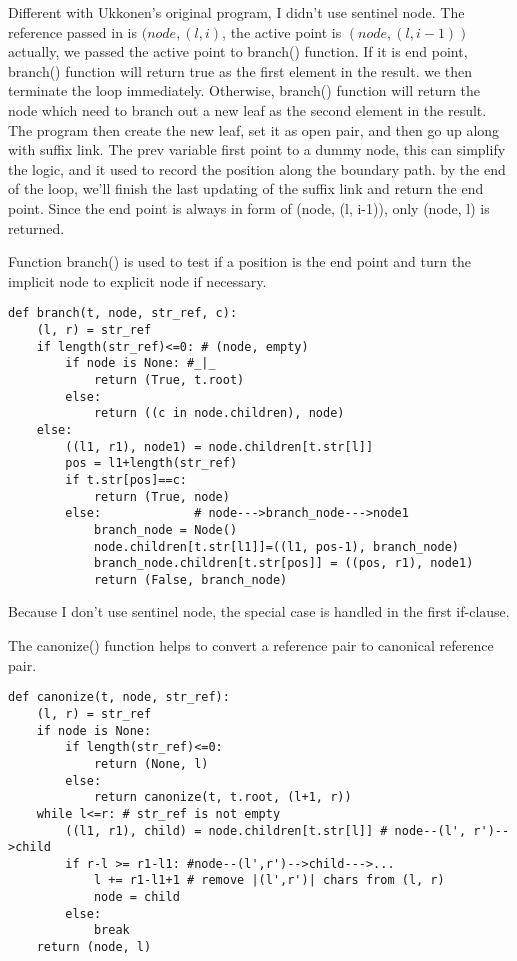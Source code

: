 \documentclass{article}
\begin{document}
Different with Ukkonen's original program, I didn't use sentinel node.
The reference passed in is $(node, (l, i)$, the active point is
$(node, (l, i-1))$ actually, we passed the active point to branch() 
function. If it is end point, branch() function will return true
as the first element in the result. we then terminate the loop immediately.
Otherwise, branch() function will return the node which need to branch
out a new leaf as the second element in the result. The program
then create the new leaf, set it as open pair, and then go up along
with suffix link. The prev variable first point to a dummy node,
this can simplify the logic, and it used to record the position along
the boundary path. by the end of the loop, we'll finish the last
updating of the suffix link and return the end point. Since the end
point is always in form of (node, (l, i-1)), only (node, l) is returned.

Function branch() is used to test if a position is the end point
and turn the implicit node to explicit node if necessary.

\begin{lstlisting}
def branch(t, node, str_ref, c):
    (l, r) = str_ref
    if length(str_ref)<=0: # (node, empty)
        if node is None: #_|_
            return (True, t.root)
        else:
            return ((c in node.children), node)
    else:
        ((l1, r1), node1) = node.children[t.str[l]]
        pos = l1+length(str_ref)
        if t.str[pos]==c:
            return (True, node)
        else:             # node--->branch_node--->node1
            branch_node = Node()
            node.children[t.str[l1]]=((l1, pos-1), branch_node)
            branch_node.children[t.str[pos]] = ((pos, r1), node1)
            return (False, branch_node)
\end{lstlisting}

Because I don't use sentinel node, the special case is handled
in the first if-clause.

The canonize() function helps to convert a reference pair to 
canonical reference pair.

\begin{lstlisting}
def canonize(t, node, str_ref):
    (l, r) = str_ref 
    if node is None:
        if length(str_ref)<=0:
            return (None, l)
        else:
            return canonize(t, t.root, (l+1, r))
    while l<=r: # str_ref is not empty
        ((l1, r1), child) = node.children[t.str[l]] # node--(l', r')-->child
        if r-l >= r1-l1: #node--(l',r')-->child--->...
            l += r1-l1+1 # remove |(l',r')| chars from (l, r)
            node = child 
        else:
            break
    return (node, l)
\end{lstlisting}
\end{document}

